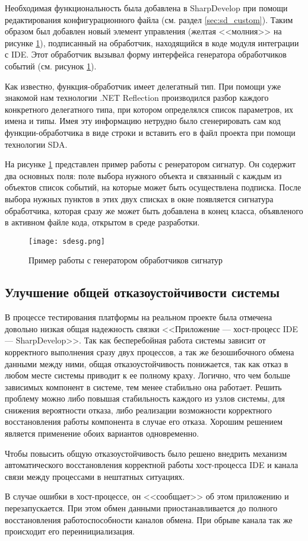 Необходимая функциональность была добавлена в SharpDevelop при помощи редактирования конфигурационного файла (см. раздел \ref{sec:sd_custom}). Таким образом был добавлен новый элемент управления (желтая <<молния>> на рисунке \ref{pic:sdesg}), подписанный на обработчик, находящийся в коде модуля интеграции с IDE. Этот обработчик вызывал форму интерфейса генератора обработчиков событий (см. рисунок \ref{pic:sdesg}).

Как известно, функция-обработчик имеет делегатный тип. При помощи уже знакомой нам технологии .NET Reflection производился разбор каждого конкретного делегатного типа, при котором определялся список параметров, их имена и типы. Имея эту информацию нетрудно было сгенерировать сам код функции-обработчика в виде строки и вставить его в файл проекта при помощи технологии SDA.

На рисунке \ref{pic:sdesg} представлен пример работы с ренератором сигнатур. Он содержит два основных поля: поле выбора нужного объекта и связанный с каждым из объектов список событий, на которые может быть осуществлена подписка. После выбора нужных пунктов в этих двух списках в окне появляется сигнатура обработчика, которая сразу же может быть добавлена в конец класса, объявленого в активном файле кода, открытом в среде разработки.

\begin{figure}[!h]
    \centering
    \texttt{[image: sdesg.png]}
    \caption{Пример работы с генератором обработчиков сигнатур}
    \label{pic:sdesg}
\end{figure}

 
\subsection{Улучшение общей отказоустойчивости системы}
\label{sec:stability}

В процессе тестирования платформы на реальном проекте была отмечена довольно низкая общая надежность связки <<Приложение --- хост-процесс IDE --- SharpDevelop>>. Так как бесперебойная работа системы зависит от корректного выполнения сразу двух процессов, а так же безошибочного обмена данными между ними, общая отказоустойчивость понижается, так как отказ в любом месте системы приводит к ее полному краху. Логично, что чем больше зависимых компонент в системе, тем менее стабильно она работает. Решить проблему можно либо повышая стабильность каждого из узлов системы, для снижения вероятности отказа, либо реализации возможности корректного восстановления работы компонента в случае его отказа. Хорошим решением является применение обоих вариантов одновременно.

Чтобы повысить общую отказоустойчивость было решено внедрить механизм автоматического восстановления корректной работы хост-процесса IDE и канала связи между процессами в нештатных ситуациях.

В случае ошибки в хост-процессе, он <<сообщает>> об этом приложению и перезапускается. При этом обмен данными приостанавливается до полного восстановления работоспособности каналов обмена. При обрыве канала так же происходит его переинициализация.

\pagebreak